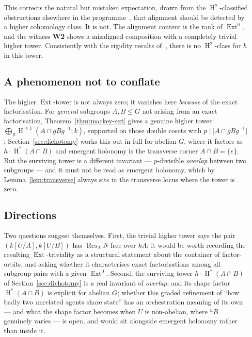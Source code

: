 \documentclass[11pt]{amsart}
\theoremstyle{plain}
\theoremstyle{definition}
\DeclareMathOperator{\Res}{Res}
\DeclareMathOperator{\Ext}{Ext}
\DeclareMathOperator{\Hh}{H}
\newcommand{\conj}[2]{{}^{#1}\!#2}
\begin{document}
This corrects the natural but mistaken expectation, drawn from the $\Hh^2$-classified
obstructions elsewhere in the programme~\cite{macbeth-zs,macbeth-reentrancy}, that alignment
should be detected by a higher cohomology class. It is not. The alignment content is the
rank of $\Ext^0$, and the witness \textbf{W2} shows a misaligned composition with a
completely trivial higher tower. Consistently with the rigidity results
of~\cite{macbeth-twoomega}, there is no $\Hh^2$-class for $h$ in this tower.

\subsection*{A phenomenon not to conflate}
The higher $\Ext$-tower is not always zero; it vanishes here \emph{because} of the exact
factorisation. For \emph{general} subgroups $A,B\le G$ not arising from an exact
factorisation, Theorem~\ref{thm:mackey-ext} gives a genuine higher tower
$\bigoplus_g\Hh^{\ge 1}(A\cap gBg^{-1};k)$, supported on those double cosets with
$p\mid\lvert A\cap gBg^{-1}\rvert$; Section~\ref{sec:dichotomy} works this out in full for
abelian $G$, where it factors as $h\cdot\Hh^*(A\cap B)$ and emergent holonomy is the
transverse corner $A\cap B=\{e\}$. But the surviving tower is a different invariant ---
$p$-divisible \emph{overlap} between two subgroups --- and it must not be read as emergent
holonomy, which by Lemma~\ref{lem:transverse} always sits in the transverse locus where the
tower is zero.

\subsection*{Directions}
Two questions suggest themselves. First, the trivial higher tower says the pair
$(k[U/A],k[U/B])$ has $\Res_A N$ free over $kA$; it would be worth recording the resulting
$\Ext$-triviality as a structural statement about the container of factor-orbits, and asking
whether it characterises exact factorisations among all subgroup pairs with a given
$\Ext^0$. Second, the surviving tower $h\cdot\Hh^*(A\cap B)$ of
Section~\ref{sec:dichotomy} is a real invariant of \emph{overlap}, and its shape factor
$\Hh^*(A\cap B)$ is explicit for abelian $G$; whether this graded refinement of ``how badly
two unrelated agents share state'' has an orchestration meaning of its own --- and what the
shape factor becomes when $U$ is non-abelian, where $\conj{u}{B}$ genuinely varies --- is
open, and would sit alongside emergent holonomy rather than inside it.
\end{document}
